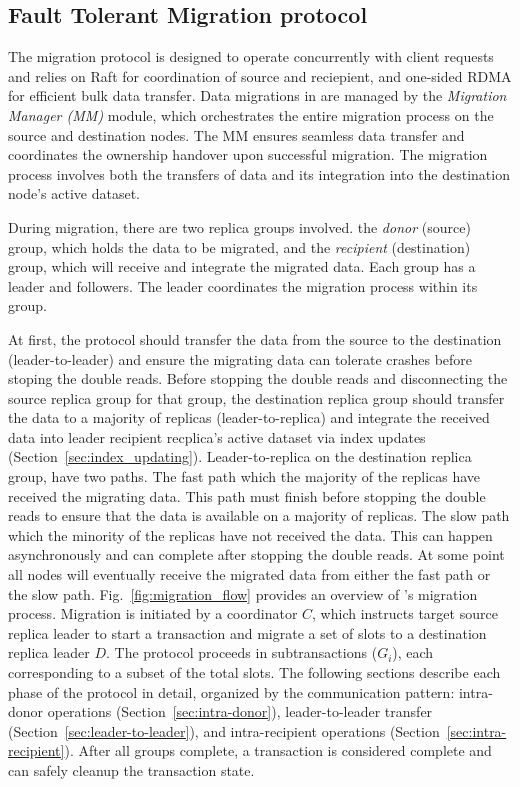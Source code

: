\subsection{Fault Tolerant Migration protocol}
\label{sec:migration-protocol}

The migration protocol is designed to operate concurrently with client requests and relies on Raft for coordination of source and reciepient,
and one-sided RDMA for efficient bulk data transfer.
Data migrations in \OurImplementation{} are managed by the \emph{Migration Manager (MM)} module, which orchestrates the entire migration process on the source and destination nodes.
The MM ensures seamless data transfer and coordinates the ownership handover upon successful migration.
The migration process involves both the transfers of data and its integration into the destination node’s active dataset.

During migration, there are two replica groups involved.
the \emph{donor} (source) group, which holds the data to be migrated, and the \emph{recipient} (destination) group,
which will receive and integrate the migrated data. Each group has a leader and followers. The leader coordinates the migration process within its group.

At first, the protocol should transfer the data from the source to the destination (leader-to-leader) and ensure the migrating data can tolerate crashes before stoping the double reads.
Before stopping the double reads and disconnecting the source replica group for that group, the destination replica group should transfer the data to a majority of replicas (leader-to-replica)
and integrate the received data into leader recipient recplica’s active dataset via index updates (Section~\ref{sec:index_updating}).
Leader-to-replica on the destination replica group, have two paths. The fast path which the majority of the replicas have received the migrating data. This path must finish before stopping the double reads to ensure that the data is available on a majority of replicas.
The slow path which the minority of the replicas have not received the data. This can happen asynchronously and can complete after stopping the double reads.
At some point all nodes will eventually receive the migrated data from either the fast path or the slow path.
Fig.~\ref{fig:migration_flow} provides an overview of \OurImplementation{}’s migration process.
Migration is initiated by a coordinator $C$, which instructs target source replica leader to start a transaction and migrate a set of slots to a destination replica leader $D$.
The protocol proceeds in subtransactions ($G_i$), each corresponding to a subset of the total slots.
The following sections describe each phase of the protocol in detail, organized by the communication pattern: intra-donor operations (Section~\ref{sec:intra-donor}), leader-to-leader transfer (Section~\ref{sec:leader-to-leader}), and intra-recipient operations (Section~\ref{sec:intra-recipient}).
After all groups complete, a transaction is considered complete and can safely cleanup the transaction state.

